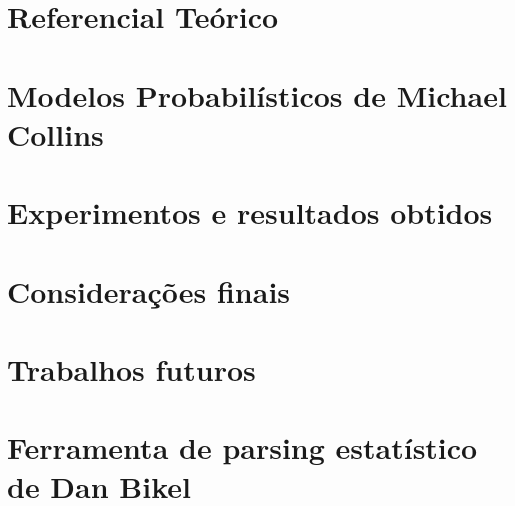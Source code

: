 \documentclass[a4paper]{abnt}
\begin{document}
\chapter{Referencial Teórico}
\label{cha:referencial_teorico}
	

\chapter{Modelos Probabilísticos de Michael Collins}
\label{cha:michael_collins}
	

\chapter{Experimentos e resultados obtidos}
\label{cha:resultados_obtidos}
	

\chapter{Considerações finais}
\label{cha:consideracoes_finais}
	

\chapter{Trabalhos futuros}
\label{cha:trabsfuturos}
	

\appendix

\chapter{Ferramenta de parsing estatístico de Dan Bikel}
\label{cha:dan_bikel1}
	



%
%

\renewcommand{\bibname}{Referência Bibliografia}

\end{document}
